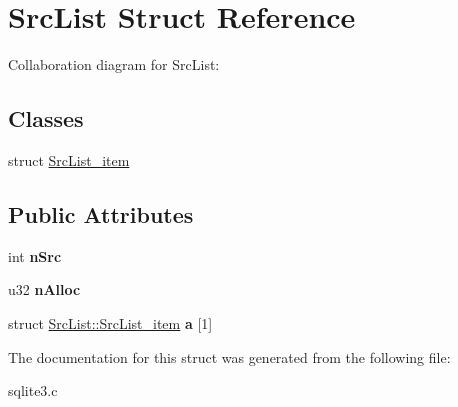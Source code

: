 \hypertarget{structSrcList}{}\section{Src\+List Struct Reference}
\label{structSrcList}


Collaboration diagram for Src\+List\+:
\subsection*{Classes}
\begin{DoxyCompactItemize}
\item 
struct \hyperlink{structSrcList_1_1SrcList__item}{Src\+List\+\_\+item}
\end{DoxyCompactItemize}
\subsection*{Public Attributes}
\begin{DoxyCompactItemize}
\item 
int {\bfseries n\+Src}\hypertarget{structSrcList_a8ecf9cced910877d93210ace66365ec8}{}\label{structSrcList_a8ecf9cced910877d93210ace66365ec8}

\item 
u32 {\bfseries n\+Alloc}\hypertarget{structSrcList_ab9c572bef9144ab245f7f46bc5b82a61}{}\label{structSrcList_ab9c572bef9144ab245f7f46bc5b82a61}

\item 
struct \hyperlink{structSrcList_1_1SrcList__item}{Src\+List\+::\+Src\+List\+\_\+item} {\bfseries a} \mbox{[}1\mbox{]}\hypertarget{structSrcList_acd181938f7144b40022b28072247aa3d}{}\label{structSrcList_acd181938f7144b40022b28072247aa3d}

\end{DoxyCompactItemize}


The documentation for this struct was generated from the following file\+:\begin{DoxyCompactItemize}
\item 
sqlite3.\+c\end{DoxyCompactItemize}
